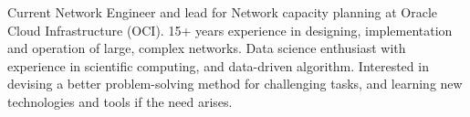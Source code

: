 

\begin{cvparagraph}

Current Network Engineer and lead for Network capacity planning at Oracle Cloud Infrastructure (OCI). 15+ years experience in designing, implementation and operation of large, complex networks. Data science enthusiast with experience in scientific computing, and data-driven algorithm. Interested in devising a better problem-solving method for challenging tasks, and learning new technologies and tools if the need arises.
\end{cvparagraph}
